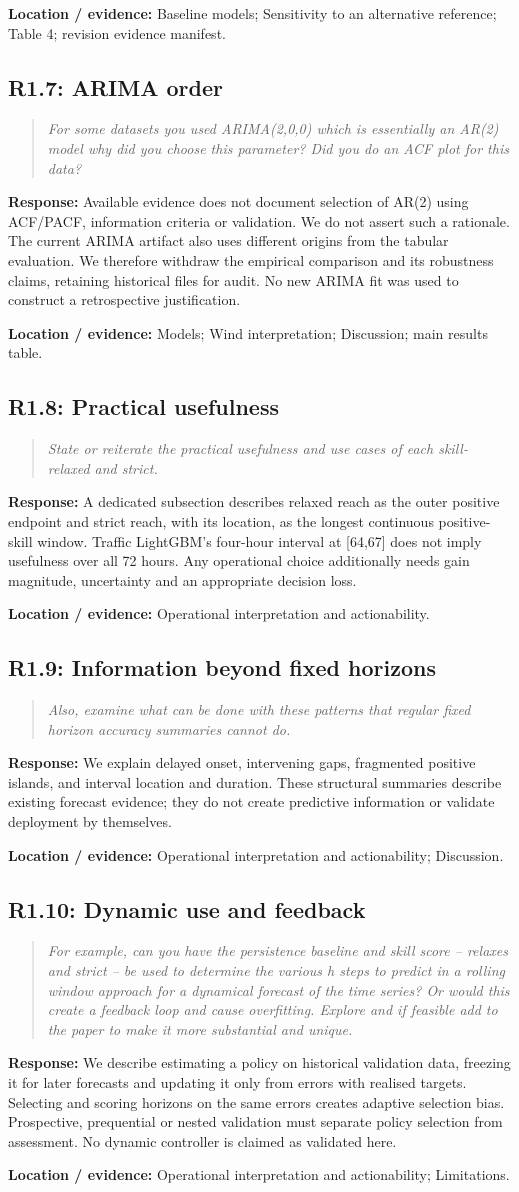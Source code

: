\documentclass[11pt,a4paper]{article}
\newcommand{\comment}[2]{\subsection*{#1}\begin{quote}\emph{#2}\end{quote}}
\newcommand{\response}[1]{\noindent\textcolor{responseblue}{\textbf{Response:}} #1\par\medskip}
\newcommand{\location}[1]{\noindent\textbf{Location / evidence:} #1\par\medskip}
\begin{document}
\location{Baseline models; Sensitivity to an alternative reference; Table 4; revision evidence manifest.}
\comment{R1.7: ARIMA order}{For some datasets you used ARIMA(2,0,0) which is essentially an AR(2) model why did you choose this parameter? Did you do an ACF plot for this data?}
\response{Available evidence does not document selection of AR(2) using ACF/PACF, information criteria or validation. We do not assert such a rationale. The current ARIMA artifact also uses different origins from the tabular evaluation. We therefore withdraw the empirical comparison and its robustness claims, retaining historical files for audit. No new ARIMA fit was used to construct a retrospective justification.}
\location{Models; Wind interpretation; Discussion; main results table.}
\comment{R1.8: Practical usefulness}{State or reiterate the practical usefulness and use cases of each skill- relaxed and strict.}
\response{A dedicated subsection describes relaxed reach as the outer positive endpoint and strict reach, with its location, as the longest continuous positive-skill window. Traffic LightGBM's four-hour interval at [64,67] does not imply usefulness over all 72 hours. Any operational choice additionally needs gain magnitude, uncertainty and an appropriate decision loss.}
\location{Operational interpretation and actionability.}
\comment{R1.9: Information beyond fixed horizons}{Also, examine what can be done with these patterns that regular fixed horizon accuracy summaries cannot do.}
\response{We explain delayed onset, intervening gaps, fragmented positive islands, and interval location and duration. These structural summaries describe existing forecast evidence; they do not create predictive information or validate deployment by themselves.}
\location{Operational interpretation and actionability; Discussion.}
\comment{R1.10: Dynamic use and feedback}{For example, can you have the persistence baseline and skill score -- relaxes and strict -- be used to determine the various h steps to predict in a rolling window approach for a dynamical forecast of the time series? Or would this create a feedback loop and cause overfitting. Explore and if feasible add to the paper to make it more substantial and unique.}
\response{We describe estimating a policy on historical validation data, freezing it for later forecasts and updating it only from errors with realised targets. Selecting and scoring horizons on the same errors creates adaptive selection bias. Prospective, prequential or nested validation must separate policy selection from assessment. No dynamic controller is claimed as validated here.}
\location{Operational interpretation and actionability; Limitations.}
\end{document}
